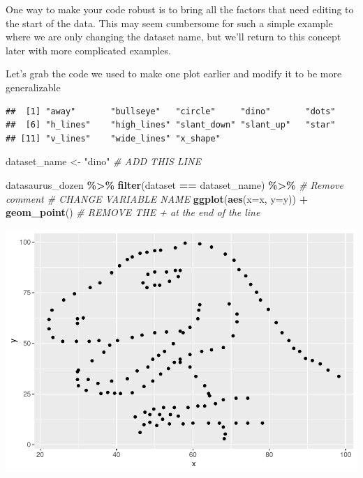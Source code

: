 \documentclass[
]{book}
\newenvironment{Shaded}{\begin{snugshade}}{\end{snugshade}}
\newcommand{\AttributeTok}[1]{\textcolor[rgb]{0.13,0.29,0.53}{#1}}
\newcommand{\CommentTok}[1]{\textcolor[rgb]{0.56,0.35,0.01}{\textit{#1}}}
\newcommand{\FunctionTok}[1]{\textcolor[rgb]{0.13,0.29,0.53}{\textbf{#1}}}
\newcommand{\NormalTok}[1]{#1}
\newcommand{\OtherTok}[1]{\textcolor[rgb]{0.56,0.35,0.01}{#1}}
\newcommand{\SpecialCharTok}[1]{\textcolor[rgb]{0.81,0.36,0.00}{\textbf{#1}}}
\newcommand{\StringTok}[1]{\textcolor[rgb]{0.31,0.60,0.02}{#1}}
\begin{document}
One way to make your code robust is to bring all the factors that need editing to the start of the data. This may seem cumbersome for such a simple example where we are only changing the dataset name, but we'll return to this concept later with more complicated examples.

Let's grab the code we used to make one plot earlier and modify it to be more generalizable

\begin{Shaded}
\end{Shaded}

\begin{verbatim}
##  [1] "away"       "bullseye"   "circle"     "dino"       "dots"      
##  [6] "h_lines"    "high_lines" "slant_down" "slant_up"   "star"      
## [11] "v_lines"    "wide_lines" "x_shape"
\end{verbatim}

\begin{Shaded}
\begin{Highlighting}[]
\NormalTok{dataset\_name }\OtherTok{\textless{}{-}} \StringTok{"dino"} \CommentTok{\# ADD THIS LINE}

\NormalTok{datasaurus\_dozen }\SpecialCharTok{\%\textgreater{}\%} 
  \FunctionTok{filter}\NormalTok{(dataset }\SpecialCharTok{==}\NormalTok{ dataset\_name) }\SpecialCharTok{\%\textgreater{}\%} \CommentTok{\# Remove comment \# CHANGE VARIABLE NAME}
  \FunctionTok{ggplot}\NormalTok{(}\FunctionTok{aes}\NormalTok{(}\AttributeTok{x=}\NormalTok{x, }\AttributeTok{y=}\NormalTok{y)) }\SpecialCharTok{+} 
  \FunctionTok{geom\_point}\NormalTok{() }\CommentTok{\# REMOVE THE + at the end of the line}
\end{Highlighting}
\end{Shaded}

\includegraphics{_main_files/figure-latex/unnamed-chunk-71-1.pdf}
\end{document}
